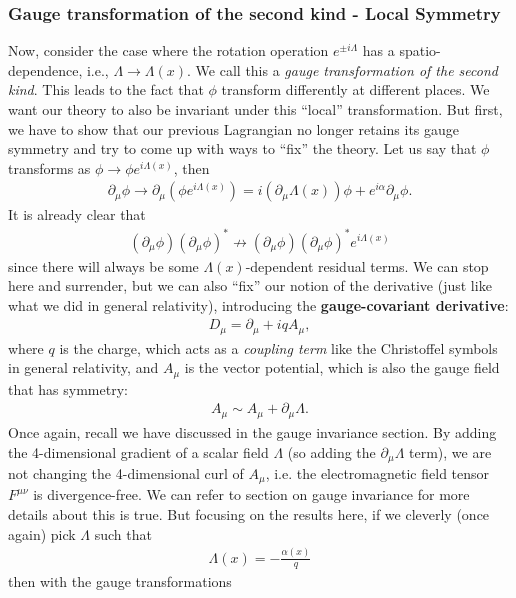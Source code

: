 \documentclass[a4paper,11pt]{article}
\numberwithin{equation}{section}
\theoremstyle{definition}
\newcommand{\p}{\partial}
\begin{document}
\subsubsection{Gauge transformation of the second kind - Local Symmetry}
Now, consider the case where the rotation operation $e^{\pm i \Lambda}$ has a spatio-dependence, i.e., $\Lambda \to \Lambda(x)$. We call this a \textit{gauge transformation of the second kind}. This leads to the fact that $\phi$ transform differently at different places. We want our theory to also be invariant under this ``local'' transformation. But first, we have to show that our previous Lagrangian no longer retains its gauge symmetry and try to come up with ways to ``fix'' the theory. Let us say that $\phi$ transforms as $\phi \to \phi e^{i\Lambda(x)}$, then
\begin{align*}
\p_\mu \phi \to \p_\mu (\phi e^{i\Lambda(x)}) = i(\p_\mu \Lambda(x))\phi + e^{i\alpha}\p_\mu \phi.
\end{align*}
It is already clear that 
\begin{align*}
(\p_\mu \phi)(\p_\mu \phi)^* \not\to (\p_\mu \phi)(\p_\mu \phi)^* e^{i\Lambda(x)}
\end{align*}
since there will always be some $\Lambda(x)$-dependent residual terms. We can stop here and surrender, but we can also ``fix'' our notion of the derivative (just like what we did in general relativity), introducing the \textbf{gauge-covariant derivative}:
\begin{align*}
D_\mu = \p_\mu + iqA_\mu,
\end{align*}
where $q$ is the charge, which acts as a \textit{coupling term} like the Christoffel symbols in general relativity, and $A_\mu$ is the vector potential, which is also the gauge field that has symmetry:
\begin{align*}
A_\mu \sim A_\mu + \p_\mu\Lambda.
\end{align*}
Once again, recall we have discussed in the gauge invariance section. By adding the 4-dimensional gradient of a scalar field $\Lambda$ (so adding the $\p_\mu \Lambda$ term), we are not changing the 4-dimensional curl of $A_\mu$, i.e. the electromagnetic field tensor $F^{\mu\nu}$ is divergence-free. We can refer to section on gauge invariance for more details about this is true. But focusing on the results here, if we cleverly (once again) pick $\Lambda$ such that
\begin{align*}
\Lambda(x) = -\frac{\alpha(x)}{q}
\end{align*}
then with the gauge transformations
\end{document}

